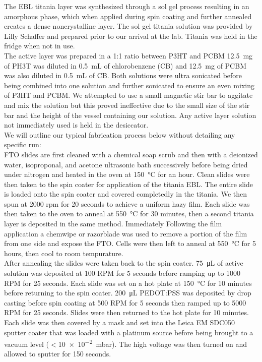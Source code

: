 	The EBL titania layer was synthesized through a sol gel process resulting in an amorphous phase, which when applied during spin coating and further annealed creates a dense noncrystalline layer. The sol gel titania solution was provided by Lilly Schaffer and prepared prior to our arrival at the lab. Titania was held in the fridge when not in use.\\
	
	The active layer was prepared in a 1:1 ratio between P3HT and PCBM\cite{P3HTPCBM} \SI{12.5}{\milli\gram} of PH3T was diluted in \SI{0.5}{\milli\liter} of chlorobenzene (CB) and \SI{12.5}{\milli\gram} of PCBM was also diluted in \SI{0.5}{\milli\liter} of CB. Both solutions were ultra sonicated before being combined into one solution and further sonicated to ensure an even mixing of P3HT and PCBM. We attempted to use a small magnetic stir bar to aggitate and mix the solution but this proved ineffective due to the small size of the stir bar and the height of the vessel containing our solution. Any active layer solution not immediately used is held in the desiccator. \\
	
	We will outline our typical fabrication process below without detailing any specific run:\\
	
	FTO slides are first cleaned with a chemical soap scrub and then with a deionized water, isoproponal, and acetone ultrasonic bath successively before being dried under nitrogen and heated in the oven at \SI{150}{\celsius} for an hour. Clean slides were then taken to the spin coater for application of the titania EBL. The entire slide is loaded onto the spin coater and covered completedly in the titania. We then spun at 2000 rpm for 20 seconds to achieve a uniform hazy film. Each slide was then taken to the oven to anneal at \SI{550}{\celsius} for 30 minutes, then a second titania layer is deposited in the same method. Immediately Following the film application a chemwipe or razorblade was used to remove a portion of the film from one side and expose the FTO. Cells were then left to anneal at \SI{550}{\celsius} for 5 hours, then cool to room tempurature. \\
	
	After annealing the slides were taken back to the spin coater. \SI{75}{\micro\liter} of active solution was deposited at 100 RPM for 5 seconds before ramping up to 1000 RPM for 25 seconds. Each slide was set on a hot plate at \SI{150}{\celsius} for 10 minutes before returning to the spin coater. \SI{200}{\micro\liter} PEDOT:PSS was deposited by drop casting before spin coating at 500 RPM for 5 seconds then ramped up to 5000 RPM for 25 seconds. Slides were then returned to the hot plate for 10 minutes. Each slide was then covered by a mask and set into the Leica EM SDC050 sputter coater that was loaded with a platinum source before being brought to a vacuum level ($<$\SI{10e-2}{\milli\bar}). The high voltage was then turned on and allowed to sputter for 150 seconds. \\
	
	
